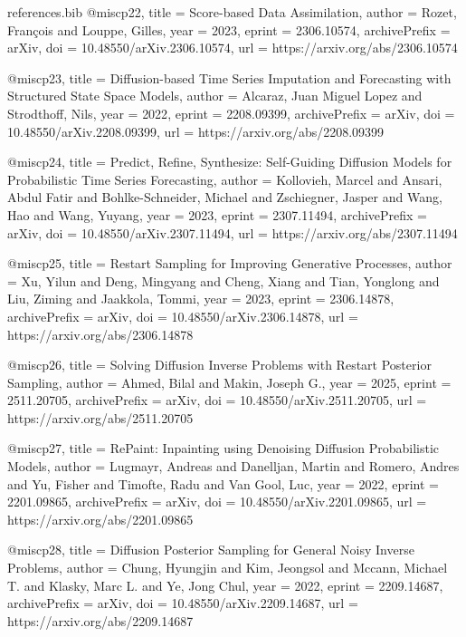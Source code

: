 \begin{filecontents*}{references.bib}
@misc{p22,
  title = {{Score-based Data Assimilation}},
  author = {Rozet, François and Louppe, Gilles},
  year = {2023},
  eprint = {2306.10574},
  archivePrefix = {arXiv},
  doi = {10.48550/arXiv.2306.10574},
  url = {https://arxiv.org/abs/2306.10574}
}

@misc{p23,
  title = {{Diffusion-based Time Series Imputation and Forecasting with Structured State Space Models}},
  author = {Alcaraz, Juan Miguel Lopez and Strodthoff, Nils},
  year = {2022},
  eprint = {2208.09399},
  archivePrefix = {arXiv},
  doi = {10.48550/arXiv.2208.09399},
  url = {https://arxiv.org/abs/2208.09399}
}

@misc{p24,
  title = {{Predict, Refine, Synthesize: Self-Guiding Diffusion Models for Probabilistic Time Series Forecasting}},
  author = {Kollovieh, Marcel and Ansari, Abdul Fatir and Bohlke-Schneider, Michael and Zschiegner, Jasper and Wang, Hao and Wang, Yuyang},
  year = {2023},
  eprint = {2307.11494},
  archivePrefix = {arXiv},
  doi = {10.48550/arXiv.2307.11494},
  url = {https://arxiv.org/abs/2307.11494}
}

@misc{p25,
  title = {{Restart Sampling for Improving Generative Processes}},
  author = {Xu, Yilun and Deng, Mingyang and Cheng, Xiang and Tian, Yonglong and Liu, Ziming and Jaakkola, Tommi},
  year = {2023},
  eprint = {2306.14878},
  archivePrefix = {arXiv},
  doi = {10.48550/arXiv.2306.14878},
  url = {https://arxiv.org/abs/2306.14878}
}

@misc{p26,
  title = {{Solving Diffusion Inverse Problems with Restart Posterior Sampling}},
  author = {Ahmed, Bilal and Makin, Joseph G.},
  year = {2025},
  eprint = {2511.20705},
  archivePrefix = {arXiv},
  doi = {10.48550/arXiv.2511.20705},
  url = {https://arxiv.org/abs/2511.20705}
}

@misc{p27,
  title = {{RePaint: Inpainting using Denoising Diffusion Probabilistic Models}},
  author = {Lugmayr, Andreas and Danelljan, Martin and Romero, Andres and Yu, Fisher and Timofte, Radu and Van Gool, Luc},
  year = {2022},
  eprint = {2201.09865},
  archivePrefix = {arXiv},
  doi = {10.48550/arXiv.2201.09865},
  url = {https://arxiv.org/abs/2201.09865}
}

@misc{p28,
  title = {{Diffusion Posterior Sampling for General Noisy Inverse Problems}},
  author = {Chung, Hyungjin and Kim, Jeongsol and Mccann, Michael T. and Klasky, Marc L. and Ye, Jong Chul},
  year = {2022},
  eprint = {2209.14687},
  archivePrefix = {arXiv},
  doi = {10.48550/arXiv.2209.14687},
  url = {https://arxiv.org/abs/2209.14687}
}


\end{filecontents*}
